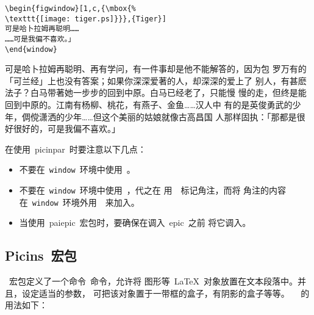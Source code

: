 \begin{Verbatim}
\begin{figwindow}[1,c,{\mbox{%
\texttt{[image: tiger.ps]}}},{Tiger}]
可是哈卜拉姆再聪明……
……可是我偏不喜欢。」
\end{window}
\end{Verbatim}

\begin{figwindow}
	可是哈卜拉姆再聪明、再有学问，有一件事却是他不能解答的，因为包
	罗万有的「可兰经」上也没有答案；如果你深深爱著的人，却深深的爱上了
	别人，有甚麽法子？白马带著她一步步的回到中原。白马已经老了，只能慢
	慢的走，但终是能回到中原的。江南有杨柳、桃花，有燕子、金鱼……汉人中
	有的是英俊勇武的少年，倜傥潇洒的少年……但这个美丽的姑娘就像古高昌国
	人那样固执：「那都是很好很好的，可是我偏不喜欢。」
\end{figwindow}


在使用~\textsf{picinpar}~时要注意以下几点：
\begin{itemize}
	\item 不要在~\texttt{window}~环境中使用~。
	\item 不要在~\texttt{window}~环境中使用~，代之在
	用~~标记角注，而将
	角注的内容在~\texttt{window}~环境外用~~来加入。
	\item 当使用~pai{epic}~宏包时，要确保在调入~\textsf{epic}~之前
	将它调入。
\end{itemize}

\subsection{Picins~宏包}\label{ssec:picins}

~宏包定义了一个命令~命令，允许将
图形等~\LaTeX{}~对象放置在文本段落中。并且，设定适当的参数，
可把该对象置于一带框的盒子，有阴影的盒子等等。~~
的用法如下：



